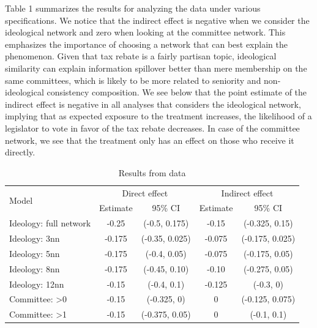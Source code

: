 \documentclass[12pt]{article}
\begin{document}
Table 1 summarizes the results for analyzing the \citet{butler2011can} data under various specifications.  We notice that the indirect effect is negative when we consider  the  ideological  network  and  zero  when  looking  at  the  committee  network.   This emphasizes the importance of choosing a network that can best explain the phenomenon. Given that tax rebate is a fairly partisan topic,  ideological similarity can explain information spillover better than mere membership on the same committees, which is likely to be more related to seniority and non-ideological consistency composition.  We see below that the point estimate of the indirect effect is negative in all analyses that considers the ideological network, implying that as expected exposure to the treatment increases, the likelihood of a legislator to vote in favor of the tax rebate decreases.  In case of the committee network, we see that the treatment only has an effect on those who receive it directly.

\begin{table}[h]
\centering
\begin{tabular}{lcccc}
\toprule
\multirow{2}{*}{Model} & \multicolumn{2}{c}{Direct effect} & \multicolumn{2}{c}{Indirect effect} \\
\cmidrule(l){2-3} \cmidrule(l){4-5}
 & Estimate & 95\% CI & Estimate & 95\% CI \\
\midrule
Ideology: full network  & -0.25 & (-0.5, 0.175) & -0.15 & (-0.325, 0.15)\\
Ideology: 3nn & -0.175 & (-0.35, 0.025) & -0.075 & (-0.175, 0.025)\\
Ideology: 5nn & -0.175 & (-0.4, 0.05) & -0.075 & (-0.175, 0.05)\\
Ideology: 8nn & -0.175 & (-0.45, 0.10) & -0.10 & (-0.275, 0.05)\\
Ideology: 12nn & -0.15 &(-0.4,  0.1) & -0.125 & (-0.3, 0)\\
Committee: >0& -0.15 & (-0.325, 0) & 0 & (-0.125, 0.075)\\
Committee: >1 & -0.15 & (-0.375, 0.05) & 0 & (-0.1, 0.1)\\
\bottomrule
\end{tabular}
\caption{Results from \citet{coppock2014information} data}
\end{table}
\end{document}
